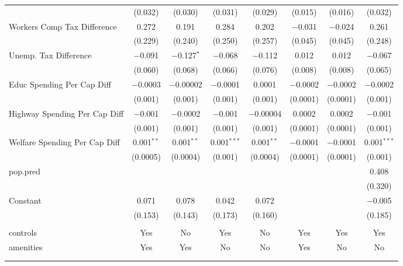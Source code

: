 \begin{table}[!htbp]
\begin{tabular}{@{\extracolsep{5pt}}lccccccc}
  & (0.032) & (0.030) & (0.031) & (0.029) & (0.015) & (0.016) & (0.032) \\ 
  Workers Comp Tax Difference & 0.272 & 0.191 & 0.284 & 0.202 & $-$0.031 & $-$0.024 & 0.261 \\ 
  & (0.229) & (0.240) & (0.250) & (0.257) & (0.045) & (0.045) & (0.248) \\ 
  Unemp. Tax Difference & $-$0.091 & $-$0.127$^{*}$ & $-$0.068 & $-$0.112 & 0.012 & 0.012 & $-$0.067 \\ 
  & (0.060) & (0.068) & (0.066) & (0.076) & (0.008) & (0.008) & (0.065) \\ 
  Educ Spending Per Cap Diff & $-$0.0003 & $-$0.00002 & $-$0.0001 & 0.0001 & $-$0.0002 & $-$0.0002 & $-$0.0002 \\ 
  & (0.001) & (0.001) & (0.001) & (0.001) & (0.0001) & (0.0001) & (0.001) \\ 
  Highway Spending Per Cap Diff & $-$0.001 & $-$0.0002 & $-$0.001 & $-$0.00004 & 0.0002 & 0.0002 & $-$0.001 \\ 
  & (0.001) & (0.001) & (0.001) & (0.001) & (0.0001) & (0.0001) & (0.001) \\ 
  Welfare Spending Per Cap Diff & 0.001$^{**}$ & 0.001$^{**}$ & 0.001$^{***}$ & 0.001$^{**}$ & $-$0.0001 & $-$0.0001 & 0.001$^{***}$ \\ 
  & (0.0005) & (0.0004) & (0.001) & (0.0004) & (0.0001) & (0.0001) & (0.001) \\ 
  pop.pred &  &  &  &  &  &  & 0.408 \\ 
  &  &  &  &  &  &  & (0.320) \\ 
  Constant & 0.071 & 0.078 & 0.042 & 0.072 &  &  & $-$0.005 \\ 
  & (0.153) & (0.143) & (0.173) & (0.160) &  &  & (0.185) \\ 
 \hline \\[-1.8ex] 
controls & Yes & No & Yes & No & Yes & Yes & Yes \\ 
amenities & Yes & Yes & No & No & Yes & No & No \\ 
\hline \\[-1.8ex] 
\hline 
\hline \\[-1.8ex] 
\end{tabular} 
\end{table} 
